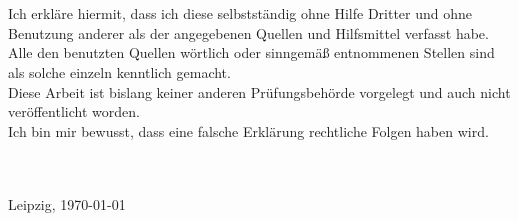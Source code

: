\chapter*{\thesisAffidavitName}

Ich erkläre hiermit, dass ich diese \thesisDesignator{} selbstständig ohne Hilfe Dritter und ohne Benutzung anderer als der angegebenen Quellen und Hilfsmittel verfasst habe. Alle den benutzten Quellen wörtlich oder sinngemäß entnommenen Stellen sind als solche einzeln kenntlich gemacht.\\
Diese Arbeit ist bislang keiner anderen Prüfungsbehörde vorgelegt und auch nicht veröffentlicht worden.\\
Ich bin mir bewusst, dass eine falsche Erklärung rechtliche Folgen haben wird.

{
\vspace{32pt}
\noindent
\hdashrule{5cm}{1pt}{1pt 3pt}\\
\textbf{\thesisAuthor{}}\\
Leipzig, \today
}
